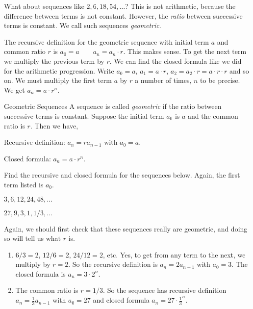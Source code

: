 \documentclass[12pt]{article}
\begin{document}
What about sequences like $2, 6, 18, 54, \ldots$?  This is not arithmetic, because the difference between terms is not constant.  However, the {\em ratio} between successive terms is constant.  We call such sequences {\em geometric}.

The recursive definition for the geometric sequence with initial term $a$ and common ratio $r$ is 
$a_0 = a \qquad a_n = a_{n}\cdot r.$
This makes sense.  To get the next term we multiply the previous term by $r$.  We can find the closed formula like we did for the arithmetic progression.  Write $a_0 = a$, $a_1 = a\cdot r$, $a_2 = a_2 \cdot r = a\cdot r \cdot r$ and so on.  We must multiply the first term $a$ by $r$ a number of times, $n$ to be precise.  We get $a_n = a\cdot r^{n}$.

\begin{defbox}{Geometric Sequences}
  A sequence is called {\em geometric} if the ratio between successive terms is constant.
  Suppose the initial term $a_0$ is $a$ and the common ratio is $r$.  Then we have,
  
  Recursive definition: $a_n = ra_{n-1}$ with $a_0 = a$.
  
  Closed formula: $a_n = a\cdot r^{n}$.
\end{defbox}


\begin{example}
  Find the recursive and closed formula for the sequences below.  Again, the first term listed is $a_0$.
  \begin{enumerate}
  \begin{multicols}{2}
    \item $3, 6, 12, 24, 48, \ldots$
    \item $27, 9, 3, 1, 1/3, \ldots$
    \end{multicols}
  \end{enumerate}
  \begin{solution}
    Again, we should first check that these sequences really are geometric, and doing so will tell us what $r$ is.
    \begin{enumerate}
      \item $6/3 = 2$, $12/6 = 2$, $24/12 = 2$, etc.  Yes, to get from any term to the next, we multiply by $r = 2$.  So the recursive definition is $a_n = 2a_{n-1}$ with $a_0 = 3$.  The closed formula is $a_n = 3\cdot 2^{n}$.
      \item The common ratio is $r = 1/3$.  So the sequence has recursive definition $a_n = \frac{1}{3}a_{n-1}$ with $a_0 = 27$ and closed formula $a_n = 27\cdot \frac{1}{3}^{n}$.
    \end{enumerate}
  \end{solution}
\end{example}
\end{document}
